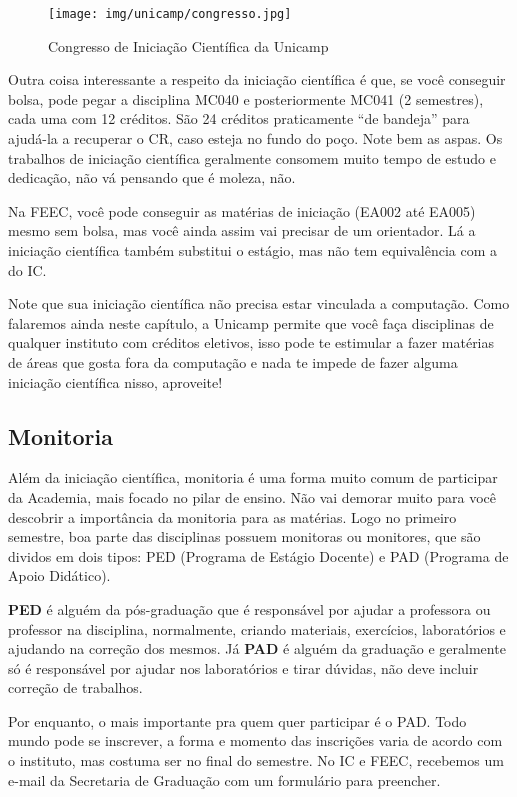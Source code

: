 \begin{figure}[h!]
    \centering
    \texttt{[image: img/unicamp/congresso.jpg]}
    \caption*{Congresso de Iniciação Científica da Unicamp}
\end{figure}

Outra coisa interessante a respeito da iniciação científica é que, se você
conseguir bolsa, pode pegar a disciplina MC040 e posteriormente MC041 (2
semestres), cada uma com 12 créditos. São 24 créditos praticamente ``de
bandeja'' para ajudá-la a recuperar o CR, caso esteja no fundo do poço. Note
bem as aspas. Os trabalhos de iniciação científica geralmente consomem muito
tempo de estudo e dedicação, não vá pensando que é moleza, não.

Na FEEC, você pode conseguir as matérias de iniciação (EA002 até EA005) mesmo
sem bolsa, mas você ainda assim vai precisar de um orientador. Lá a iniciação
científica também substitui o estágio, mas não tem equivalência com a do IC.

Note que sua iniciação científica não precisa estar vinculada a computação.
Como falaremos ainda neste capítulo, a Unicamp permite que você faça
disciplinas de qualquer instituto com créditos eletivos, isso pode te estimular
a fazer matérias de áreas que gosta fora da computação e nada te impede de
fazer alguma iniciação científica nisso, aproveite!

\subsection{Monitoria}

Além da iniciação científica, monitoria é uma forma muito comum de participar
da Academia, mais focado no pilar de ensino. Não vai demorar muito para você
descobrir a importância da monitoria para as matérias. Logo no primeiro
semestre, boa parte das disciplinas possuem monitoras ou monitores, que são
dividos em dois tipos: PED (Programa de Estágio Docente) e PAD (Programa de
Apoio Didático).

\textbf{PED} é alguém da pós-graduação que é responsável por ajudar a
professora ou professor na disciplina, normalmente, criando materiais,
exercícios, laboratórios e ajudando na correção dos mesmos. Já \textbf{PAD} é
alguém da graduação e geralmente só é responsável por ajudar nos laboratórios e
tirar dúvidas, não deve incluir correção de trabalhos.

Por enquanto, o mais importante pra quem quer participar é o PAD. Todo mundo
pode se inscrever, a forma e momento das inscrições varia de acordo com o
instituto, mas costuma ser no final do semestre. No IC e FEEC, recebemos um
e-mail da Secretaria de Graduação com um formulário para preencher.

